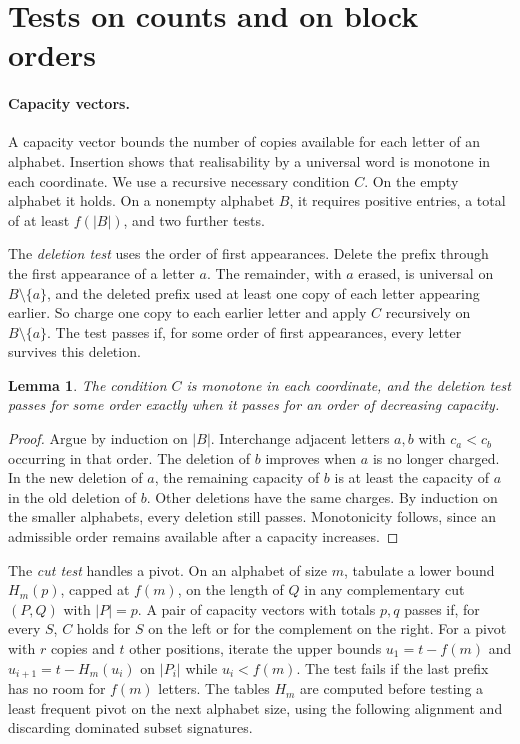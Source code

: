 \documentclass[11pt]{article}
\newtheorem{lemma}[theorem]{Lemma}
\begin{document}
\section{Tests on counts and on block orders}\label{sec:tests}
\paragraph{Capacity vectors.}
A capacity vector bounds the number of copies available for each letter of an alphabet. Insertion shows that realisability by a universal word is monotone in each coordinate. We use a recursive necessary condition $C$. On the empty alphabet it holds. On a nonempty alphabet $B$, it requires positive entries, a total of at least $f(|B|)$, and two further tests.

The \emph{deletion test} uses the order of first appearances. Delete the prefix through the first appearance of a letter $a$. The remainder, with $a$ erased, is universal on $B\setminus\{a\}$, and the deleted prefix used at least one copy of each letter appearing earlier. So charge one copy to each earlier letter and apply $C$ recursively on $B\setminus\{a\}$. The test passes if, for some order of first appearances, every letter survives this deletion.

\begin{lemma}\label{lem:order}
The condition $C$ is monotone in each coordinate, and the deletion test passes for some order exactly when it passes for an order of decreasing capacity.
\end{lemma}
\begin{proof}
Argue by induction on $|B|$. Interchange adjacent letters $a,b$ with $c_a<c_b$ occurring in that order. The deletion of $b$ improves when $a$ is no longer charged. In the new deletion of $a$, the remaining capacity of $b$ is at least the capacity of $a$ in the old deletion of $b$. Other deletions have the same charges. By induction on the smaller alphabets, every deletion still passes. Monotonicity follows, since an admissible order remains available after a capacity increases.
\end{proof}

The \emph{cut test} handles a pivot. On an alphabet of size $m$, tabulate a lower bound $H_m(p)$, capped at $f(m)$, on the length of $Q$ in any complementary cut $(P,Q)$ with $|P|=p$. A pair of capacity vectors with totals $p,q$ passes if, for every $S$, $C$ holds for $S$ on the left or for the complement on the right. For a pivot with $r$ copies and $t$ other positions, iterate the upper bounds $u_1=t-f(m)$ and $u_{i+1}=t-H_m(u_i)$ on $|P_i|$ while $u_i<f(m)$. The test fails if the last prefix has no room for $f(m)$ letters. The tables $H_m$ are computed before testing a least frequent pivot on the next alphabet size, using the following alignment and discarding dominated subset signatures.
\end{document}
